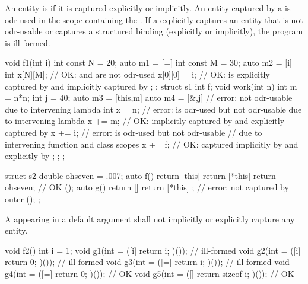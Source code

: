 \pnum
An entity is  if it is captured explicitly or implicitly. An entity
captured by a  is odr-used in the scope
containing the .
If a 
explicitly captures an entity that is not odr-usable
or
captures a structured binding (explicitly or implicitly),
the program is
ill-formed. \begin{example}
%
\begin{codeblock}
void f1(int i) {
  int const N = 20;
  auto m1 = [=]{
    int const M = 30;
    auto m2 = [i]{
      int x[N][M];              // OK:  and  are not odr-used
      x[0][0] = i;              // OK:  is explicitly captured by  and implicitly captured by 
    };
  };
  struct s1 {
    int f;
    void work(int n) {
      int m = n*n;
      int j = 40;
      auto m3 = [this,m] {
        auto m4 = [&,j] {       // error:  not odr-usable due to intervening lambda 
          int x = n;            // error:  is odr-used but not odr-usable due to intervening lambda 
          x += m;               // OK:  implicitly captured by  and explicitly captured by 
          x += i;               // error:  is odr-used but not odr-usable
                                // due to intervening function and class scopes
          x += f;               // OK:  captured implicitly by  and explicitly by 
        };
      };
    }
  };
}

struct s2 {
  double ohseven = .007;
  auto f() {
    return [this] {
      return [*this] {
          return ohseven;       // OK
      }
    }();
  }
  auto g() {
    return [] {
      return [*this] { };       // error:  not captured by outer 
    }();
  }
};
\end{codeblock}
\end{example}

\pnum
A  appearing in a default argument shall not
implicitly or explicitly capture any entity. \begin{example}

\begin{codeblock}
void f2() {
  int i = 1;
  void g1(int = ([i]{ return i; })());          // ill-formed
  void g2(int = ([i]{ return 0; })());          // ill-formed
  void g3(int = ([=]{ return i; })());          // ill-formed
  void g4(int = ([=]{ return 0; })());          // OK
  void g5(int = ([]{ return sizeof i; })());    // OK
}
\end{codeblock}
\end{example}

